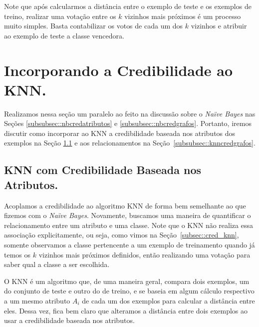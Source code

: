 Note que após calcularmos a distância entre o exemplo de teste e os exemplos de treino, realizar uma votação entre os $k$ vizinhos mais próximos é um processo muito simples. Basta contabilizar os votos de cada um dos $k$ vizinhos e atribuir ao exemplo de teste a classe vencedora.

\section{Incorporando a Credibilidade ao \textsc{KNN}.}
\label{subsubsec::knn_cred}

Realizamos nessa seção um paralelo ao feito na discussão sobre o \textit{Naïve Bayes} nas Seções \ref{subsubsec::nbcredatributos} e \ref{subsubsec::nbcredgrafos}. Portanto, iremos discutir como incorporar ao \textsc{KNN} a credibilidade baseada nos atributos dos exemplos na Seção \ref{subsubsec::knncredatributos} e aos relacionamentos na Seção~\ref{subsubsec::knncredgrafos}.

\subsection{\textsc{KNN} com Credibilidade Baseada nos Atributos.}
\label{subsubsec::knncredatributos}


Acoplamos a credibilidade ao algoritmo \textsc{KNN} de forma bem semelhante ao que fizemos com o \textit{Naïve Bayes}.
Novamente, buscamos uma maneira de quantificar o relacionamento entre um atributo e uma classe.
Note que o \textsc{KNN} não realiza essa associação explicitamente, ou seja, como vimos na Seção~\ref{subsec::cred_knn}, somente observamos a classe pertencente a um exemplo de treinamento quando já temos os $k$ vizinhos mais próximos definidos, então realizando uma votação para saber qual a classe a ser escolhida.

O \textsc{KNN} é um algoritmo que, de uma maneira geral, compara dois exemplos, um do conjunto de teste e outro do de treino, e se baseia em algum cálculo respectivo a um mesmo atributo $A_i$ de cada um dos exemplos para calcular a distância entre eles. Dessa vez, fica bem claro que alteramos a distância entre dois exemplos ao usar a credibilidade baseada nos atributos.

